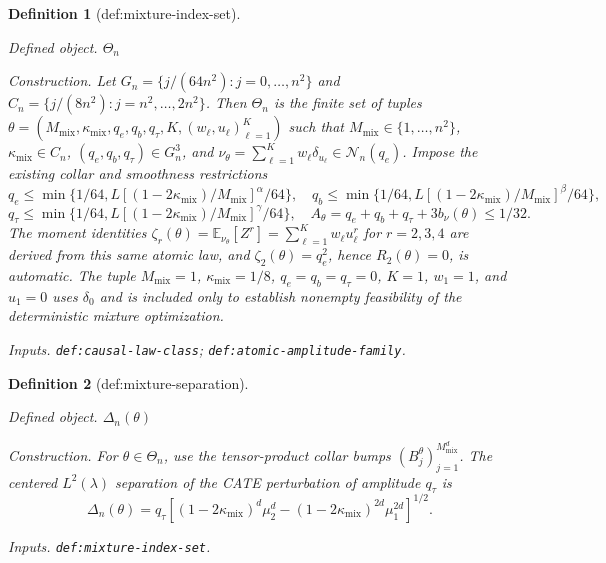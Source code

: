 \documentclass{article}
\newtheorem{definition}{Definition}
\begin{document}
\begin{definition}[def:mixture-index-set]\label{def:mixture-index-set}
\par\smallskip\noindent\emph{Defined object.} \(\Theta_n\)
\par\smallskip\noindent\emph{Construction.} Let \(G_n=\{j/(64n^2):j=0,\ldots,n^2\}\) and \(C_n=\{j/(8n^2):j=n^2,\ldots,2n^2\}\). Then \(\Theta_n\) is the finite set of tuples \(\theta=(M_{\mathrm{mix}},\kappa_{\mathrm{mix}},q_e,q_b,q_\tau,K,(w_\ell,u_\ell)_{\ell=1}^K)\) such that \(M_{\mathrm{mix}}\in\{1,\ldots,n^2\}\), \(\kappa_{\mathrm{mix}}\in C_n\), \((q_e,q_b,q_\tau)\in G_n^3\), and \(\nu_\theta=\sum_{\ell=1}^K w_\ell\delta_{u_\ell}\in\mathcal N_n(q_e)\). Impose the existing collar and smoothness restrictions \[q_e\le\min\{1/64,L[(1-2\kappa_{\mathrm{mix}})/M_{\mathrm{mix}}]^\alpha/64\},\quad q_b\le\min\{1/64,L[(1-2\kappa_{\mathrm{mix}})/M_{\mathrm{mix}}]^\beta/64\},\] \[q_\tau\le\min\{1/64,L[(1-2\kappa_{\mathrm{mix}})/M_{\mathrm{mix}}]^\gamma/64\},\quad A_\theta=q_e+q_b+q_\tau+3b_\nu(\theta)\le1/32.\] The moment identities \(\zeta_r(\theta)=\mathbb E_{\nu_\theta}[Z^r]=\sum_{\ell=1}^K w_\ell u_\ell^r\) for \(r=2,3,4\) are derived from this same atomic law, and \(\zeta_2(\theta)=q_e^2\), hence \(R_2(\theta)=0\), is automatic. The tuple \(M_{\mathrm{mix}}=1\), \(\kappa_{\mathrm{mix}}=1/8\), \(q_e=q_b=q_\tau=0\), \(K=1\), \(w_1=1\), and \(u_1=0\) uses \(\delta_0\) and is included only to establish nonempty feasibility of the deterministic mixture optimization.
\par\smallskip\noindent\emph{Inputs.} \texttt{def:\allowbreak{}causal-\allowbreak{}law-\allowbreak{}class}; \texttt{def:\allowbreak{}atomic-\allowbreak{}amplitude-\allowbreak{}family}.
\end{definition}

\begin{definition}[def:mixture-separation]\label{def:mixture-separation}
\par\smallskip\noindent\emph{Defined object.} \(\Delta_n(\theta)\)
\par\smallskip\noindent\emph{Construction.} For \(\theta\in\Theta_n\), use the tensor-product collar bumps \((B_j^\theta)_{j=1}^{M_{\mathrm{mix}}^d}\). The centered \(L^2(\lambda)\) separation of the CATE perturbation of amplitude \(q_\tau\) is \[\Delta_n(\theta)=q_\tau\left[(1-2\kappa_{\mathrm{mix}})^d\mu_2^d-(1-2\kappa_{\mathrm{mix}})^{2d}\mu_1^{2d}\right]^{1/2}.\]
\par\smallskip\noindent\emph{Inputs.} \texttt{def:\allowbreak{}mixture-\allowbreak{}index-\allowbreak{}set}.
\end{definition}
\end{document}
